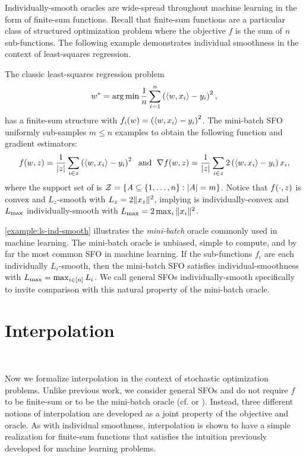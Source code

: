 Individually-smooth oracles are wide-spread throughout machine learning in the form of finite-sum functions. 
Recall that finite-sum functions are a particular class of structured optimization problem where the objective \( f \) is the sum of \( n \) sub-functions. 
The following example demonstrates individual smoothness in the context of least-squares regression. 
\begin{example}\label{example:ls-ind-smooth}
    The classic least-squares regression problem
    \[ w^* = \mathop{\rm arg\,min} \frac{1}{n} \sum_{i=1}^n \left(\left\langle w, x_i\right\rangle - y_i\right)^2, \]
    has a finite-sum structure with \( f_i(w) =  \left(\left\langle w, x_i\right\rangle - y_i\right)^2\).
    The mini-batch \ac{SFO} uniformly sub-samples \( m \leq n \) examples to obtain the following function and gradient estimators:
    \[ f(w, z) = \frac{1}{|z|} \sum_{i \in z}  \left(\left\langle w, x_i\right\rangle - y_i\right)^2 \; \text{ and } \; \nabla f(w, z) = \frac{1}{|z|} \sum_{i \in z} 2 \left(\left\langle w, x_i\right\rangle - y_i\right) x_i, \]
    where the support set of \oracle{} is \( \mathcal{Z} = \left\{ A \subseteq \left\{1, \dots, n\right\} : |A| = m \right\} \).
    Notice that \( f(\cdot, z) \) is convex and \( L_z \)-smooth with \( L_z = 2 \|x_z\|^2 \), implying \oracle{} is individually-convex and \( L_{\text{max}} \) individually-smooth with \( L_{\text{max}} = 2 \max_i \|x_i\|^2 \). 
\end{example}

\autoref{example:ls-ind-smooth} illustrates the \emph{mini-batch} oracle commonly used in machine learning.
The mini-batch oracle is unbiased, simple to compute, and by far the most common \ac{SFO} in machine learning. 
If the sub-functions \( f_i \) are each individually \( L_i \)-smooth, then the mini-batch \ac{SFO} satisfies individual-smoothness with \( L_{\text{max}} = \max_{i\in [n]} L_i \).
We call general \acp{SFO} individually-smooth specifically to invite comparison with this natural property of the mini-batch oracle. 


\section{Interpolation}~\label{sec:interpolation}

Now we formalize interpolation in the context of stochastic optimization problems.
Unlike previous work, we consider general \acp{SFO} and do not require \( f \) to be finite-sum or \oracle{} to be the mini-batch oracle (cf. \citet{vaswani2019fast} or \citet{bassily2018exponential}).
Instead, three different notions of interpolation are developed as a joint property of the objective and oracle. 
As with individual smoothness, interpolation is shown to have a simple realization for finite-sum functions that satisfies the intuition previously developed for machine learning problems. 

